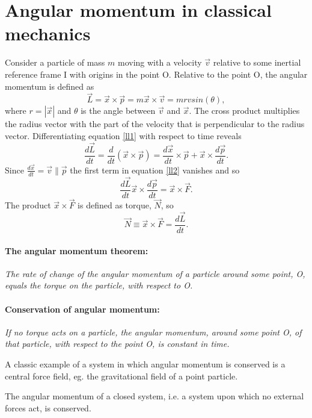\section{Angular momentum in classical mechanics}
Consider a particle of mass $m$ moving with a velocity $\vec{v}$ relative to some inertial reference frame I with origins in the point O. Relative to the point O, the angular momentum is defined as
\begin{equation}
	\vec{L}=\vec{x}\times \vec{p}=m\vec{x}\times \vec{v}=m rvsin(\theta),
	\label{ll1}
\end{equation} 
where $r=|\vec{x}|$ and $\theta$ is the angle between $\vec{v}$ and $\vec{x}$. The cross product multiplies the radius vector with the part of the velocity that is perpendicular to the radius vector. Differentiating equation \eqref{ll1} with respect to time reveals
\begin{equation}
	\frac{d\vec{L}}{dt}=\frac{d}{dt}(\vec{x}\times \vec{p})=\frac{d\vec{x}}{dt}\times \vec{p}+\vec{x}\times \frac{d\vec{p}}{dt}.
	\label{ll2}
\end{equation} 
Since $\frac{d\vec{x}}{dt}=\vec{v}\parallel \vec{p}$ the first term in equation \eqref{ll2} vanishes and so
\begin{equation}
	\frac{d\vec{L}}{dt}\vec{x}\times \frac{d\vec{p}}{dt}=\vec{x}\times\vec{F}.
\end{equation} 
The product $\vec{x}\times\vec{F}$ is defined as torque, $\vec{N}$, so
\begin{equation}
	\vec{N}\equiv \vec{x}\times\vec{F}=\frac{d\vec{L}}{dt}.
	\label{ll3}
\end{equation}  
\paragraph{The angular momentum theorem:} \emph{The rate of change of the angular momentum of a particle around some point, O, equals the torque on the particle, with respect to O.}

\paragraph{Conservation of angular momentum:} \emph{If no torque acts on a particle, the angular momentum, around some point O, of that particle, with respect to the point O, is constant in time.}

\begin{example}
	A classic example of a system in which angular momentum is conserved is a central force field, eg. the gravitational field of a point particle. 
\end{example}
\begin{example}
	The angular momentum of a closed system, i.e. a system upon which no external forces act, is conserved. 
\end{example}

